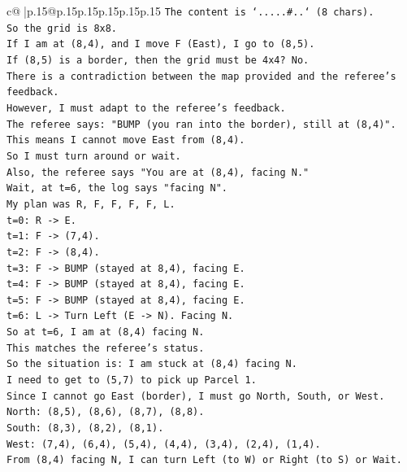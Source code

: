 \documentclass{article}
\begin{document}
{\begin{supertabular}{c@{$\;$}|p{.15\linewidth}@{}p{.15\linewidth}p{.15\linewidth}p{.15\linewidth}p{.15\linewidth}p{.15\linewidth}}
{{{\texttt{The content is `.....\#..` (8 chars).} \\
\texttt{So the grid is 8x8.} \\
\texttt{If I am at (8,4), and I move F (East), I go to (8,5).} \\
\texttt{If (8,5) is a border, then the grid must be 4x4? No.} \\
\texttt{There is a contradiction between the map provided and the referee's feedback.} \\
\texttt{However, I must adapt to the referee's feedback.} \\
\texttt{The referee says: "BUMP (you ran into the border), still at (8,4)".} \\
\texttt{This means I cannot move East from (8,4).} \\
\texttt{So I must turn around or wait.} \\
\texttt{Also, the referee says "You are at (8,4), facing N."} \\
\texttt{Wait, at t=6, the log says "facing N".} \\
\texttt{My plan was R, F, F, F, F, L.} \\
\texttt{t=0: R {-}> E.} \\
\texttt{t=1: F {-}> (7,4).} \\
\texttt{t=2: F {-}> (8,4).} \\
\texttt{t=3: F {-}> BUMP (stayed at 8,4), facing E.} \\
\texttt{t=4: F {-}> BUMP (stayed at 8,4), facing E.} \\
\texttt{t=5: F {-}> BUMP (stayed at 8,4), facing E.} \\
\texttt{t=6: L {-}> Turn Left (E {-}> N). Facing N.} \\
\texttt{So at t=6, I am at (8,4) facing N.} \\
\texttt{This matches the referee's status.} \\
\texttt{So the situation is: I am stuck at (8,4) facing N.} \\
\texttt{I need to get to (5,7) to pick up Parcel 1.} \\
\texttt{Since I cannot go East (border), I must go North, South, or West.} \\
\texttt{North: (8,5), (8,6), (8,7), (8,8).} \\
\texttt{South: (8,3), (8,2), (8,1).} \\
\texttt{West: (7,4), (6,4), (5,4), (4,4), (3,4), (2,4), (1,4).} \\
\texttt{From (8,4) facing N, I can turn Left (to W) or Right (to S) or Wait.} \\
}}}
\end{supertabular}}
\end{document}
